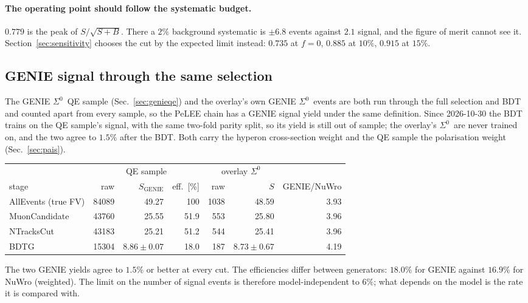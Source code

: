 \documentclass[11pt,a4paper]{article}
\newcommand{\Szero}{\ensuremath{\Sigma^{0}}}
\begin{document}
\paragraph{The operating point should follow the systematic budget.} $0.779$ is the
peak of $S/\sqrt{S+B}$. There a $2\%$ background systematic is $\pm6.8$ events against
$2.1$ signal, and the figure of merit cannot see it. Section~\ref{sec:sensitivity}
chooses the cut by the expected limit instead: $0.735$ at $f=0$, $0.885$ at $10\%$,
$0.915$ at $15\%$.

\subsection{GENIE signal through the same selection}
\label{sec:geniesig}
The GENIE \Szero\ QE sample (Sec.~\ref{sec:genieqe}) and the overlay's own GENIE
\Szero\ events are both run through the full selection and BDT and counted apart from
every sample, so the PeLEE chain has a GENIE signal yield under the same definition.
Since 2026-10-30 the BDT trains on the QE sample's signal, with the same two-fold
parity split, so its yield is still out of sample; the overlay's \Szero\ are never
trained on, and the two agree to $1.5\%$ after the BDT. Both carry the hyperon
cross-section weight and the QE sample the polarisation weight (Sec.~\ref{sec:pais}).

\begin{center}
\begin{tabular}{lrrrrrr}
\toprule
 & \multicolumn{3}{c}{QE sample} & \multicolumn{2}{c}{overlay \Szero} & \\
stage & raw & $S_{\mathrm{GENIE}}$ & eff.\ [\%] & raw & $S$ & GENIE/NuWro \\
\midrule
AllEvents (true FV)  & 84089 & 49.27 & 100   & 1038 & 48.59 & 3.93 \\
MuonCandidate        & 43760 & 25.55 & 51.9  &  553 & 25.80 & 3.96 \\
NTracksCut           & 43183 & 25.21 & 51.2  &  544 & 25.41 & 3.96 \\
BDTG                 & 15304 & $8.86\pm0.07$ & 18.0 & 187 & $8.73\pm0.67$ & 4.19 \\
\bottomrule
\end{tabular}
\end{center}

\noindent The two GENIE yields agree to $1.5\%$ or better at every cut. The efficiencies
differ between generators: $18.0\%$ for GENIE against $16.9\%$ for NuWro (weighted). The
limit on the number of signal events is therefore model-independent to $6\%$; what
depends on the model is the rate it is compared with.
\end{document}

